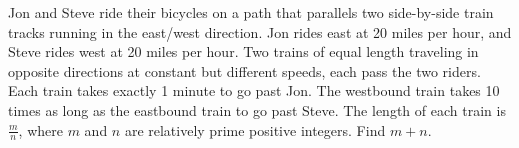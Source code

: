 Jon and Steve ride their bicycles on a path that parallels two side-by-side train tracks running in the east/west direction. Jon rides east at 20 miles per hour, and Steve rides west at 20 miles per hour. Two trains of equal length traveling in opposite directions at constant but different speeds, each pass the two riders. Each train takes exactly 1 minute to go past Jon. The westbound train takes 10 times as long as the eastbound train to go past Steve. The length of each train is $\tfrac mn$, where $m$ and $n$ are relatively prime positive integers. Find $m+n$.